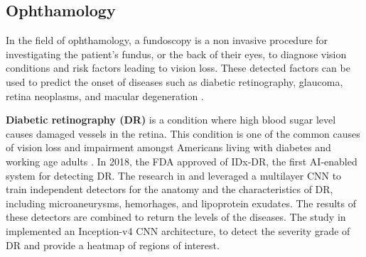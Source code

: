 \documentclass[a4paper]{article}
\begin{document}
\subsection{Ophthamology}
In the field of ophthamology, a fundoscopy is a non invasive procedure for investigating the patient's fundus, or the back of their eyes, to diagnose vision conditions and risk factors leading to vision loss.
These detected factors can be used to predict the onset of diseases such as diabetic retinography, glaucoma, retina neoplasms, and macular degeneration \cite{kumar_artificial_2023}.

\newpage
\textbf{Diabetic retinography (DR)} is a condition where high blood sugar level causes damaged vessels in the retina. 
This condition is one of the common causes of vision loss and impairment amongst Americans living with diabetes and working age adults \cite{commissioner_fda_2020,abramoff_pivotal_2018}.
In 2018, the FDA approved of IDx-DR, the first AI-enabled system for detecting DR.
The research in \cite{abramoff_improved_2016} and \cite{abramoff_pivotal_2018} leveraged a multilayer CNN to train independent detectors for the anatomy and the characteristics of DR, including microaneurysms, hemorhages, and lipoprotein exudates.
The results of these detectors are combined to return the levels of the diseases. 
The study in \cite{sayres_using_2019} implemented an Inception-v4 CNN architecture, to detect the severity grade of DR and provide a heatmap of regions of interest.
\end{document}
